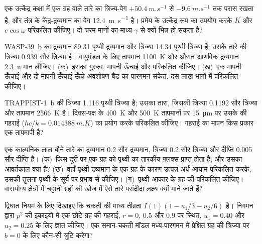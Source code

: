 \begin{exercise}[$\star\star$]\label{exo:b3:exoplanets:7}
एक उत्केंद्र कक्षा में एक ग्रह वाले तारे का त्रिज्य-वेग
$+\qty{50.4}{m.s^{-1}}$ से $-\qty{9.6}{m.s^{-1}}$ तक परास रखता है, और तंत्र के
केंद्र-द्रव्यमान का वेग \qty{12.4}{m.s^{-1}} है। प्रमेय के उत्केंद्र रूप का उपयोग करके
$K$ और $e\cos\omega$ परिकलित कीजिए। दो चरम मानों का माध्य $\gamma$ से क्यों
भिन्न हो सकता है?
\end{exercise}

\begin{exercise}[$\star\star$]\label{exo:b3:exoplanets:8}
WASP-39~b का द्रव्यमान 89.31 पृथ्वी द्रव्यमान और त्रिज्या 14.34 पृथ्वी त्रिज्या है; उसके तारे की
त्रिज्या 0.939 सौर त्रिज्या है। वायुमंडल के लिए तापमान \qty{1100}{K} और औसत आणविक
द्रव्यमान \qty{2.3}{u} मान लीजिए। (क)~इसका गुरुत्व, मापनी ऊँचाई और  परिकलित कीजिए।
(ख)~एक मापनी ऊँचाई और दो मापनी ऊँचाई ऊँचे अवशोषण बैंड का पारगमन संकेत,
दस लाख भागों में
परिकलित कीजिए।
\end{exercise}

\begin{exercise}[$\star\star$]\label{exo:b3:exoplanets:9}
TRAPPIST-1~b की त्रिज्या 1.116 पृथ्वी त्रिज्या है; उसका तारा, जिसकी त्रिज्या 0.1192 सौर
त्रिज्या और तापमान \qty{2566}{K} है। दिवस-पक्ष के \qty{400}{K} और \qty{500}{K} तापमानों पर
\qty{15}{\micro m} पर उसके  की गहराई
($hc/k = \qty{0.014388}{m.K}$) का प्रयोग करके परिकलित कीजिए। गहराई का मापन
किस प्रकार एक तापमापी है?
\end{exercise}

\begin{exercise}[$\star\star\star$]\label{exo:b3:exoplanets:10}
एक काल्पनिक लाल बौने तारे का द्रव्यमान 0.2 सौर द्रव्यमान, त्रिज्या 0.2 सौर
त्रिज्या और दीप्ति \num{0.005} सौर दीप्ति है। (क)~किस दूरी पर एक ग्रह को पृथ्वी का
तारकीय फ़्लक्स प्राप्त होता है, और उसका आवर्तकाल क्या है?
(ख)~वहाँ पृथ्वी द्रव्यमान के एक ग्रह के कारण उत्पन्न अर्ध-आयाम परिकलित करके,
उसकी तुलना पृथ्वी के सूर्य पर प्रभाव से कीजिए। (ग)~पृथ्वी-आकार के ग्रह की
 परिकलित कीजिए। वासयोग्य क्षेत्रों में चट्टानी ग्रहों की खोज में
ऐसे तारे पसंदीदा लक्ष्य क्यों माने जाते हैं?
\end{exercise}

\begin{exercise}[$\star\star\star$]\label{exo:b3:exoplanets:11}
द्विघात  नियम के लिए दिखाइए कि चकती की माध्य तीव्रता
$I(1)(1 - u_1/3 - u_2/6)$ है। निगमन द्वारा $p^2$ की इकाइयों में एक छोटे ग्रह की गहराई,
$r = 0$, $0.5$ और $0.9$ पर स्थित, $u_1 = 0.40$ और $u_2 = 0.25$ के लिए ज्ञात कीजिए।
एक समान-चकती मॉडल मध्य-पारगमन में प्रेक्षित ग्रह की त्रिज्या पर
$b = 0$ के लिए कौन-सी त्रुटि करेगा?
\end{exercise}

